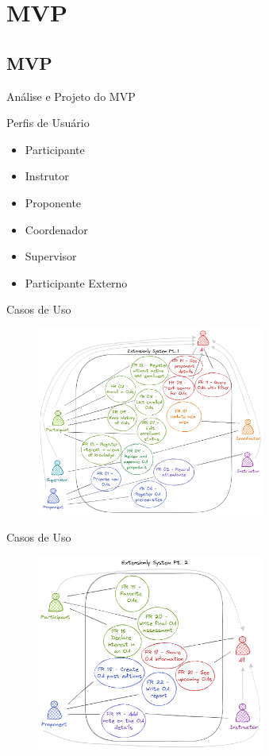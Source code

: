 \section{MVP}
\subsection*{MVP}

\begin{frame}{{\sffamily Análise e Projeto do MVP}}
  \begin{block}{Perfis de Usuário}
    \begin{itemize}
      \item Participante
      \item Instrutor
      \item Proponente
      \item Coordenador
      \item Supervisor

      \item Participante Externo
    \end{itemize}
  \end{block}
\end{frame}

\begin{frame}{{\sffamily Casos de Uso}}
  \begin{figure}
    \vfill
    \includegraphics[width=7.5cm, ]{imagens/6-use-case-1.png}
    \vfill
  \end{figure}
\end{frame}

\begin{frame}{{\sffamily Casos de Uso}}
  \begin{figure}
    \vfill
    \includegraphics[width=7.5cm, ]{imagens/6-use-case-2.png}
    \vfill
  \end{figure}
\end{frame}

